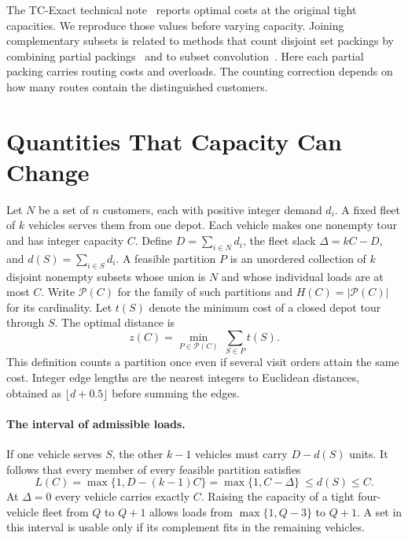 \documentclass[runningheads]{llncs}
\begin{document}
The TC-Exact technical note~\cite{tc} reports optimal costs at the original tight capacities. We reproduce those values before varying capacity. Joining complementary subsets is related to methods that count disjoint set packings by combining partial packings~\cite{pack} and to subset convolution~\cite{convolve}. Here each partial packing carries routing costs and overloads. The counting correction depends on how many routes contain the distinguished customers.

\section{Quantities That Capacity Can Change}
Let $N$ be a set of $n$ customers, each with positive integer demand $d_i$. A fixed fleet of $k$ vehicles serves them from one depot. Each vehicle makes one nonempty tour and has integer capacity $C$. Define $D=\sum_{i\in N}d_i$, the fleet slack $\Delta=kC-D$, and $d(S)=\sum_{i\in S}d_i$. A feasible partition $P$ is an unordered collection of $k$ disjoint nonempty subsets whose union is $N$ and whose individual loads are at most $C$. Write $\mathcal P(C)$ for the family of such partitions and $H(C)=|\mathcal P(C)|$ for its cardinality. Let $t(S)$ denote the minimum cost of a closed depot tour through $S$. The optimal distance is
\begin{equation}
 z(C)=\min_{P\in\mathcal P(C)}\ \sum_{S\in P}t(S).
\end{equation}
This definition counts a partition once even if several visit orders attain the same cost. Integer edge lengths are the nearest integers to Euclidean distances, obtained as $\lfloor d+0.5\rfloor$ before summing the edges.

\paragraph{The interval of admissible loads.}
If one vehicle serves $S$, the other $k-1$ vehicles must carry $D-d(S)$ units. It follows that every member of every feasible partition satisfies
\begin{equation}\label{eq:filter}
 L(C)=\max\{1,D-(k-1)C\}=\max\{1,C-\Delta\}
 \ \leq d(S)\leq C .
\end{equation}
At $\Delta=0$ every vehicle carries exactly $C$. Raising the capacity of a tight four-vehicle fleet from $Q$ to $Q+1$ allows loads from $\max\{1,Q-3\}$ to $Q+1$. A set in this interval is usable only if its complement fits in the remaining vehicles.
\end{document}
